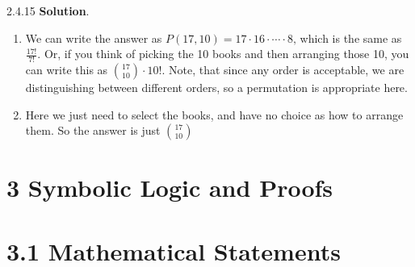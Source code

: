 \documentclass[11pt,]{book}
\theoremstyle{ptxplainnotitle}
\theoremstyle{ptxplaintitle}
\theoremstyle{ptxdefinitionnotitle}
\theoremstyle{ptxdefinitiontitle}
\theoremstyle{ptxdefinitionnotitle}
\theoremstyle{ptxdefinitiontitle}
\theoremstyle{ptxdefinitionnotitle}
\theoremstyle{ptxdefinitiontitle}
\theoremstyle{ptxdefinitiontitlenonumber}
\theoremstyle{ptxdefinitiontitlenonumber}
\numberwithin{equation}{chapter}
\begin{document}
\begin{divisionexercise}{2.4.15}
\textbf{Solution}.\quad%
\hypertarget{p-1653}{}%
\leavevmode%
\begin{enumerate}[label=\alph*.]
\item\hypertarget{li-696}{}\hypertarget{p-1654}{}%
We can write the answer as \(P(17,10) = 17 \cdot 16 \cdot \cdots \cdot 8\text{,}\) which is the same as \(\frac{17!}{7!}\text{.}\)  Or, if you think of picking the 10 books and then arranging those 10, you can write this as \(\binom{17}{10}\cdot 10!\text{.}\)  Note, that since any order is acceptable, we are distinguishing between different orders, so a permutation is appropriate here.%
\item\hypertarget{li-697}{}\hypertarget{p-1655}{}%
Here we just need to select the books, and have no choice as how to arrange them.  So the answer is just \(\binom{17}{10}\)%
\end{enumerate}
%
\end{divisionexercise}%
\section*{3 Symbolic Logic and Proofs}
\section*{3.1 Mathematical Statements}
\end{document}
